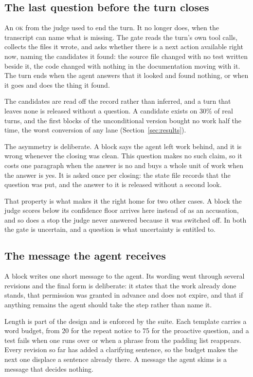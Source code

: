 \subsection{The last question before the turn closes}
\label{sec:proactive}

An \textsc{ok} from the judge used to end the turn. It no longer does, when the transcript
can name what is missing. The gate reads the turn's own tool calls, collects
the files it wrote, and asks whether there is a next action available right
now, naming the candidates it found: the source file changed with no test
written beside it, the code changed with nothing in the documentation moving
with it. The turn ends when the agent answers that it looked and found
nothing, or when it goes and does the thing it found.

The candidates are read off the record rather than inferred, and a turn that
leaves none is released without a question. A candidate exists on 30\% of real
turns, and the first blocks of the unconditional version bought no work half
the time, the worst conversion of any lane (Section~\ref{sec:results}).

The asymmetry is deliberate. A block says the agent left work behind, and it is
wrong whenever the closing was clean. This question makes no such claim, so it
costs one paragraph when the answer is no and buys a whole unit of work when
the answer is yes. It is asked once per closing: the state file records that the
question was put, and the answer to it is released without a second look.

That property is what makes it the right home for two other cases. A block the
judge scores below its confidence floor arrives here instead of as an
accusation, and so does a stop the judge never answered because it was switched
off. In both the gate is uncertain, and a question is what uncertainty is
entitled to.

\subsection{The message the agent receives}
\label{sec:tone}

A block writes one short message to the agent. Its wording went through several
revisions and the final form is deliberate: it states that the work already done
stands, that permission was granted in advance and does not expire, and that if
anything remains the agent should take the step rather than name it.

Length is part of the design and is enforced by the suite. Each template carries
a word budget, from 20 for the repeat notice to 75 for the proactive question,
and a test fails when one runs over or when a phrase from the padding list
reappears. Every revision so far has added a clarifying sentence, so the budget
makes the next one displace a sentence already there. A message the agent skims
is a message that decides nothing.

